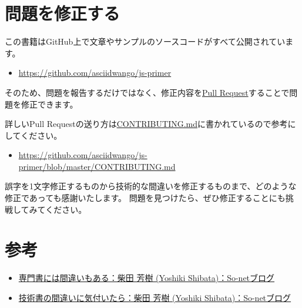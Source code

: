 \hypertarget{pull-request}{%
\section*{問題を修正する}\label{pull-request}}

この書籍はGitHub上で文章やサンプルのソースコードがすべて公開されています。

\begin{itemize}
\item
  \url{https://github.com/asciidwango/js-primer}
\end{itemize}

そのため、問題を報告するだけではなく、修正内容を\href{https://help.github.com/articles/about-pull-requests/}{Pull
Request}することで問題を修正できます。

詳しいPull
Requestの送り方は\href{https://github.com/asciidwango/js-primer/blob/master/CONTRIBUTING.md}{CONTRIBUTING.md}に書かれているので参考にしてください。

\begin{itemize}
\item
  \url{https://github.com/asciidwango/js-primer/blob/master/CONTRIBUTING.md}
\end{itemize}

誤字を1文字修正するものから技術的な間違いを修正するものまで、どのような修正であっても感謝いたします。
問題を見つけたら、ぜひ修正することにも挑戦してみてください。

\hypertarget{reference}{%
\section*{参考}\label{reference}}

\begin{itemize}
\item
  \href{https://yshibata.blog.so-net.ne.jp/2015-12-23}{専門書には間違いもある：柴田
  芳樹 (Yoshiki Shibata)：So-netブログ}
\item
  \href{https://yshibata.blog.so-net.ne.jp/2018-06-09}{技術書の間違いに気付いたら：柴田
  芳樹 (Yoshiki Shibata)：So-netブログ}
\end{itemize}
